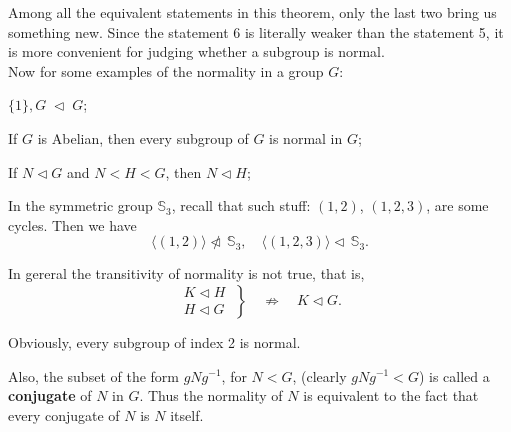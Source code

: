 \documentclass{article}
\newcommand{\nles}{\vartriangleleft}
\newcommand{\notnles}{\ntriangleleft}
\begin{document}
\begin{Rmk}{}
    Among all the equivalent statements in this theorem, only the last two bring us something new. Since the statement 6 is literally weaker than the statement 5, it is more convenient for judging whether a subgroup is normal. \\
    Now for some examples of the normality in a group $G$:
    \begin{compactenum}
        \item \textcolor{Th}{$\{1\}, G\;\nles\; G$};
        \item \textcolor{Th}{If $G$ is Abelian, then every subgroup of $G$ is normal in $G$};
        \item \textcolor{Th}{If $N\nles G$ and $N < H < G$, then $N\nles H$};
        \item \textcolor{Th}{In the symmetric group $\mathbb{S}_3$, recall that such stuff: $(1,2)$, $(1,2,3)$, are some cycles. Then we have
        $$ \langle (1,2) \rangle \notnles \,\mathbb{S}_3, \quad \langle (1,2,3) \rangle \nles \,\mathbb{S}_3. $$}
        \item \textcolor{Th}{In gereral the transitivity of normality is not true, that is, 
        $$ \left.\begin{matrix}
            K \nles H \; \\
            H \nles G \;
        \end{matrix}\right\} \quad\nRightarrow\quad K \nles G. $$}
        \item Obviously, \textcolor{Th}{every subgroup of index 2 is normal.}
    \end{compactenum}
    \textcolor{Df}{Also, the subset of the form $gNg^{-1}$, for $N<G$, (clearly $gNg^{-1} < G$) is called a \textbf{conjugate} of $N$ in $G$.} Thus \textcolor{Th}{the normality of $N$ is equivalent to the fact that every conjugate of $N$ is $N$ itself.}
\end{Rmk}
\end{document}

